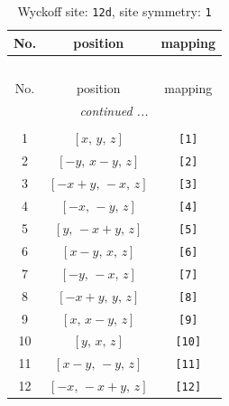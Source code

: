 \documentclass[fleqn,8pt]{jsarticle}
\begin{document}
\begin{longtable}{ccc}
\caption{Wyckoff site: {\tt 12d}, site symmetry: {\tt 1}}
 \\
 \hline \hline
No. & position & mapping \\ \hline \endfirsthead

\multicolumn{2}{l}{\tablename\ \thetable{}} \\
 \hline \hline
No. & position & mapping \\ \hline \endhead

 \hline \hline
\multicolumn{2}{r}{\footnotesize\it continued ...} \\ \endfoot

 \hline \hline
\multicolumn{2}{r}{} \\ \endlastfoot

1 & $\left[ x,\, y,\, z \right]$ & {\tt [1]} \\ \hline
2 & $\left[ - y,\, x - y,\, z \right]$ & {\tt [2]} \\ \hline
3 & $\left[ - x + y,\, - x,\, z \right]$ & {\tt [3]} \\ \hline
4 & $\left[ - x,\, - y,\, z \right]$ & {\tt [4]} \\ \hline
5 & $\left[ y,\, - x + y,\, z \right]$ & {\tt [5]} \\ \hline
6 & $\left[ x - y,\, x,\, z \right]$ & {\tt [6]} \\ \hline
7 & $\left[ - y,\, - x,\, z \right]$ & {\tt [7]} \\ \hline
8 & $\left[ - x + y,\, y,\, z \right]$ & {\tt [8]} \\ \hline
9 & $\left[ x,\, x - y,\, z \right]$ & {\tt [9]} \\ \hline
10 & $\left[ y,\, x,\, z \right]$ & {\tt [10]} \\ \hline
11 & $\left[ x - y,\, - y,\, z \right]$ & {\tt [11]} \\ \hline
12 & $\left[ - x,\, - x + y,\, z \right]$ & {\tt [12]} \\
\end{longtable}
\end{document}
